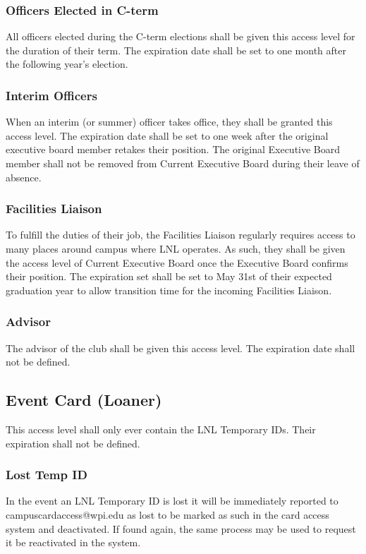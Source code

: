 \documentclass[12pt,letterpaper,oneside]{book}
\begin{document}
\subsubsection{Officers Elected in C-term}
All officers elected during the C-term elections shall be given this access level for the duration of their term. The expiration date shall be set to one month after the following year's election.

\subsubsection{Interim Officers}
When an interim (or summer) officer takes office, they shall be granted this access level. The expiration date shall be set to one week after the original executive board member retakes their position. The original Executive Board member shall not be removed from Current Executive Board during their leave of absence.

\subsubsection{Facilities Liaison}
To fulfill the duties of their job, the Facilities Liaison regularly requires access to many places around campus where LNL operates. As such, they shall be given the access level of Current Executive Board once the Executive Board confirms their position. The expiration set shall be set to May 31st of their expected graduation year to allow transition time for the incoming Facilities Liaison.

\subsubsection{Advisor}
The advisor of the club shall be given this access level. The expiration date shall not be defined.

\subsection{Event Card (Loaner)}
This access level shall only ever contain the LNL Temporary IDs. Their expiration shall not be defined.

\subsubsection{Lost Temp ID}
In the event an LNL Temporary ID is lost it will be immediately reported to campuscardaccess@wpi.edu as lost to be marked as such in the card access system and deactivated. If found again, the same process may be used to request it be reactivated in the system.
\end{document}
